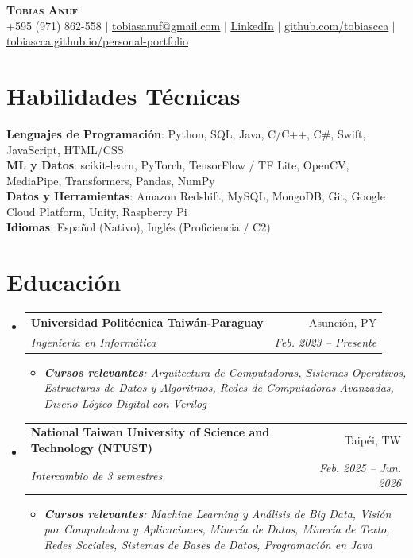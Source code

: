 \documentclass[letterpaper,11pt]{article}
\makeatletter
\newcommand{\resumeItem}[1]{
  \item\small{
    {#1 \vspace{-2pt}}
  }
}
\newcommand{\resumeSubheading}[4]{
  \vspace{-2pt}\item
    \begin{tabular*}{0.97\textwidth}[t]{l@{\extracolsep{\fill}}r}
      \textbf{#1} & #2 \\
      \textit{\small#3} & \textit{\small #4} \\
    \end{tabular*}\vspace{-7pt}
}
\newcommand{\resumeSubHeadingListStart}{\begin{itemize}[leftmargin=0.15in, label={}]}
\newcommand{\resumeSubHeadingListEnd}{\end{itemize}}
\newcommand{\resumeItemListStart}{\begin{itemize}}
\newcommand{\resumeItemListEnd}{\end{itemize}\vspace{-5pt}}
\makeatother
\begin{document}
\begin{center}
    \textbf{\Huge \scshape Tobias Anuf} \\ \vspace{1pt}
    \small +595 (971) 862-558 $|$
    \href{mailto:tobiasanuf@gmail.com}{\underline{tobiasanuf@gmail.com}} $|$
    \href{https://www.linkedin.com/in/tobias-anuf-0003942b2}{\underline{LinkedIn}} $|$
    \href{https://github.com/tobiascca}{\underline{github.com/tobiascca}} $|$
    \href{https://tobiascca.github.io/personal-portfolio/}{\underline{tobiascca.github.io/personal-portfolio}}
\end{center}

\section{Habilidades Técnicas}
 \begin{itemize}[leftmargin=0.15in, label={}]
    \small{\item{
     \textbf{Lenguajes de Programación}{: Python, SQL, Java, C/C++, C\#, Swift, JavaScript, HTML/CSS} \\
     \textbf{ML y Datos}{: scikit-learn, PyTorch, TensorFlow / TF Lite, OpenCV, MediaPipe, Transformers, Pandas, NumPy} \\
     \textbf{Datos y Herramientas}{: Amazon Redshift, MySQL, MongoDB, Git, Google Cloud Platform, Unity, Raspberry Pi} \\
     \textbf{Idiomas}{: Español (Nativo), Inglés (Proficiencia / C2)}
    }}
 \end{itemize}

\section{Educación}
  \resumeSubHeadingListStart
    \resumeSubheading
      {Universidad Politécnica Taiwán-Paraguay}{Asunción, PY}
      {Ingeniería en Informática}{Feb. 2023 -- Presente}
      \resumeItemListStart
        \resumeItem{\textit{\textbf{Cursos relevantes}: Arquitectura de Computadoras, Sistemas Operativos, Estructuras de Datos y Algoritmos, Redes de Computadoras Avanzadas, Diseño Lógico Digital con Verilog}}
      \resumeItemListEnd
    \resumeSubheading
      {National Taiwan University of Science and Technology (NTUST)}{Taipéi, TW}
      {Intercambio de 3 semestres}{Feb. 2025 -- Jun. 2026}
      \resumeItemListStart
        \resumeItem{\textit{\textbf{Cursos relevantes}: Machine Learning y Análisis de Big Data, Visión por Computadora y Aplicaciones, Minería de Datos, Minería de Texto, Redes Sociales, Sistemas de Bases de Datos, Programación en Java}}
      \resumeItemListEnd
  \resumeSubHeadingListEnd
\end{document}
